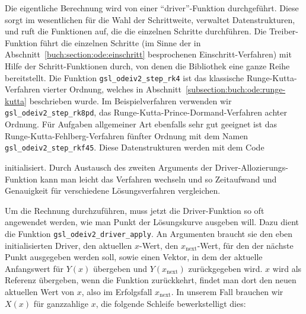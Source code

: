 Die eigentliche Berechnung wird von einer ``driver''-Funktion durchgeführt.
Diese sorgt im wesentlichen für die Wahl der Schrittweite, verwaltet
Datenstrukturen, und ruft die Funktionen auf, die die einzelnen Schritte
durchführen.
Die Treiber-Funktion führt die einzelnen Schritte (im Sinne der
in Abschnitt~\ref{buch:section:ode:einschritt} besprochenen
Einschritt-Verfahren) mit
Hilfe der Schritt-Funktionen durch, von denen die Bibliothek eine
ganze Reihe bereitstellt.
Die Funktion \texttt{gsl\_odeiv2\_step\_rk4} ist das klassische
Runge-Kutta-Verfahren vierter Ordnung, welches in
Abschnitt~\ref{subsection:buch:ode:runge-kutta}
beschrieben wurde.
%
Im Beispielverfahren verwenden wir \texttt{gsl\_odeiv2\_step\_rk8pd},
das Runge-Kutta-Prince-Dormand-Verfahren achter Ordnung.
Für Aufgaben allgemeiner Art ebenfalls sehr gut geeignet ist das
Runge-Kutta-Fehlberg-Verfahren fünfter Ordnung mit dem Namen
\texttt{gsl\_odeiv2\_step\_rkf45}.
%
Diese Datenstrukturen werden mit dem Code

initialisiert.
Durch Austausch des zweiten Arguments der Driver-Allozierungs-Funktion
kann man leicht das Verfahren wechseln und so Zeitaufwand und Genauigkeit
für verschiedene Lösungsverfahren vergleichen.
%

Um die Rechnung durchzuführen, muss jetzt die Driver-Funktion so oft
angewendet werden, wie man Punkt der Lösungskurve ausgeben will.
Dazu dient die Funktion \texttt{gsl\_odeiv2\_driver\_apply}. 
An Argumenten braucht sie den eben initialisierten Driver, den aktuellen
$x$-Wert, den $x_{\text{next}}$-Wert, für den der nächste Punkt
ausgegeben werden soll, sowie einen Vektor, in dem der aktuelle Anfangswert
für $Y(x)$ übergeben und $Y(x_{\text{next}})$ zurückgegeben wird.
$x$ wird als Referenz übergeben, wenn die Funktion zurückkehrt,
findet man dort den neuen aktuellen Wert von $x$, also im Erfolgsfall
$x_{\text{next}}$.
In unserem Fall brauchen wir $X(x)$ für ganzzahlige $x$, die folgende
Schleife bewerkstelligt dies:



